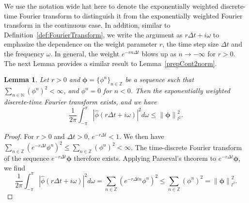 \documentclass[10pt,a4paper]{amsart}
\newtheorem{lemma}{Lemma}
\newcommand{\norm}[1]{\left\lVert#1\right\rVert}
\begin{document}
We use the notation wide hat here to denote the exponentially weighted discrete-time Fourier transform to distinguish it from the exponentially weighted Fourier transform in the continuous case. In addition, similar to Definition~\ref{def:FourierTransform}, we write the argument as $r\Delta t + i\omega$ to emphasize the dependence on the weight parameter $r$, the time step size $\Delta t$ and the frequency $\omega$. 
In general, the weight $e^{-rn\Delta t}$ blows up as $n\to -\infty$ for $r>0$. The next Lemma provides a similar result to Lemma~\ref{prepCont2norm}.

\begin{lemma}\label{prepDisc2norm}
Let $r > 0$ and $\boldsymbol{\phi} = \{\phi^n\}_{n\in\mathbb{Z}}$ be a sequence such that $ \sum_{n\in\mathbb{N}} (\phi^n)^2 < \infty$, and $\phi^n=0$ for $n<0$. Then the exponentially weighted discrete-time Fourier transform exists, and we have
\[\frac{1}{2 \pi} \int_{-\pi}^{\pi} |\widehat{\phi}(r\Delta t+i\omega)|^2 d\omega \leq \norm{\boldsymbol{\phi}}_{l^2}^2.\]
\end{lemma}


\begin{proof}
For $r>0$ and $\Delta t> 0$, $e^{-r \Delta t} < 1$. 
We then have $\sum_{n\in\mathbb{Z}}(e^{-r \Delta t} \phi^n)^2 \leq \sum_{n\in\mathbb{Z}} (\phi^n)^2 < \infty$. The time-discrete Fourier transform of the sequence $e^{-r \Delta t } \boldsymbol{\phi}$ therefore exists. Applying Parseval's theorem to $e^{-r \Delta t } \boldsymbol{\phi}$, we find
\[\frac{1}{2\pi} \int_{-\pi}^{\pi} \left|\widehat{\phi}(r \Delta t + i\omega)\right|^2 d \omega= \sum_{n\in\mathbb{Z}} (e^{-r \Delta t n} \phi^{n})^2 \leq \sum_{n\in\mathbb{Z}} (\phi^{n})^2 = \norm{\boldsymbol{\phi}}_{l^2}^2.\]
\end{proof}
\end{document}
